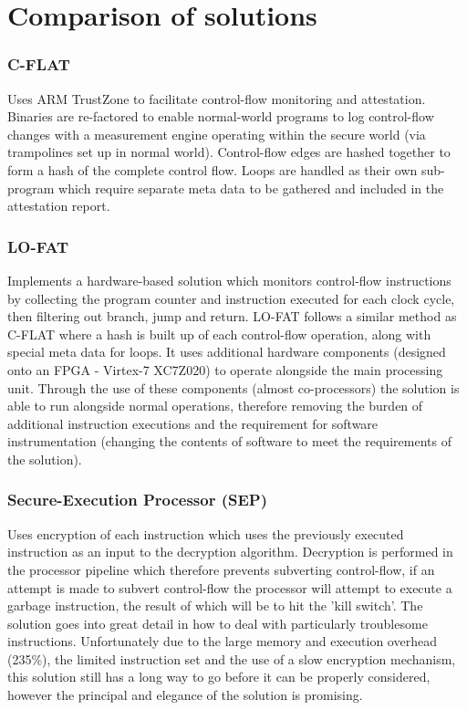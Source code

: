 \section{Comparison of solutions}

\subsubsection{C-FLAT}
Uses ARM TrustZone to facilitate control-flow monitoring and attestation. Binaries are re-factored to enable normal-world programs to log control-flow changes with a measurement engine operating within the secure world (via trampolines set up in normal world). Control-flow edges are hashed together to form a hash of the complete control flow. Loops are handled as their own sub-program which require separate meta data to be gathered and included in the attestation report.

\subsubsection{LO-FAT}
Implements a hardware-based solution which monitors control-flow instructions by collecting the program counter and instruction executed for each clock cycle, then filtering out branch, jump and return. LO-FAT follows a similar method as C-FLAT where a hash is built up of each control-flow operation, along with special meta data for loops. It uses additional hardware components (designed onto an FPGA - Virtex-7 XC7Z020) to operate alongside the main processing unit. Through the use of these components (almost co-processors) the solution is able to run alongside normal operations, therefore removing the burden of additional instruction executions and the requirement for software instrumentation (changing the contents of software to meet the requirements of the solution).

\subsubsection{Secure-Execution Processor (SEP)}
Uses encryption of each instruction which uses the previously executed instruction as an input to the decryption algorithm. Decryption is performed in the processor pipeline which therefore prevents subverting control-flow, if an attempt is made to subvert control-flow the processor will attempt to execute a garbage instruction, the result of which will be to hit the 'kill switch'. The solution goes into great detail in how to deal with particularly troublesome instructions. Unfortunately due to the large memory and execution overhead (235\%), the limited instruction set and the use of a slow encryption mechanism, this solution still has a long way to go before it can be properly considered, however the principal and elegance of the solution is promising.

